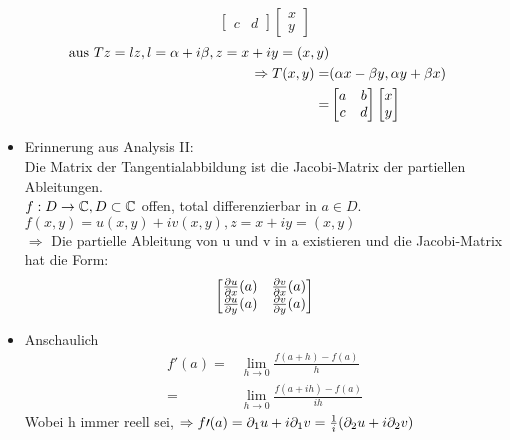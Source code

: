 \begin{bemerkung}
\begin{itemize}
\begin{bew}
\[\begin{bmatrix}
			c & d
			\end{bmatrix}
			\begin{bmatrix}
			x \\
			y
			\end{bmatrix}\]
			\begin{eqnarray*}
				\text{aus } Tz = lz, l= \alpha + i\beta, z = x + iy = (x,y) \\
				\Rightarrow T(x,y) =& (\alpha x - \beta y, \alpha y + \beta x)\\
				=& \begin{bmatrix}
					a & b \\
					c & d
				\end{bmatrix}
				\begin{bmatrix}
					x \\
					y
				\end{bmatrix}
			\end{eqnarray*}
			
		\end{bew}
		\item
		Erinnerung aus Analysis II:\\
		Die Matrix der Tangentialabbildung ist die Jacobi-Matrix der 
		partiellen Ableitungen.\\
		$f:D \to \mathbb{C}, D\subset \mathbb{C}$ offen, total differenzierbar in $a \in D$.\\
		$f(x,y) = u(x,y) +iv(x,y), z = x+iy=(x,y)$\\
		$\Rightarrow$ Die partielle Ableitung von u und v in a existieren und die 
		Jacobi-Matrix hat die Form:
		\[
		\begin{bmatrix}
		\frac{\partial u}{\partial x}(a) & \frac{\partial v}{\partial x}(a)\\
		\frac{\partial u}{\partial y}(a) & \frac{\partial v}{\partial y}(a)\\
		\end{bmatrix}	 
		\]
		\item
		Anschaulich
		\begin{eqnarray*}
			f\prime(a) =&\lim_{h \to 0} \frac{f(a+h)-f(a)}{h}\\
			=& \lim_{h\to 0} \frac{f(a+ih)-f(a)}{ih}
		\end{eqnarray*}
		Wobei h immer reell sei,
		$\Rightarrow f\prime(a) = \partial_1 u + i\partial_1 v = \frac{1}{i}(\partial_2 u 
		+ i \partial_2 v)$
	\end{itemize}
\end{bemerkung}

